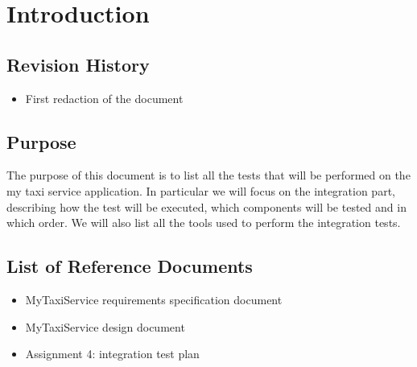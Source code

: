 \section{Introduction}

\subsection{Revision History}
\begin{itemize}
	\item \date{15/01/2016} First redaction of the document
\end{itemize}

\subsection{Purpose}
The purpose of this document is to list all the tests that will be performed on the my taxi service application. 
In particular we will focus on the integration part, describing how the test will be executed, which components will be tested and in which order.
We will also list all the tools used to perform the integration tests.

\subsection{List of Reference Documents}
\begin{itemize}
	\item MyTaxiService requirements specification document
	\item MyTaxiService design document
	\item Assignment 4: integration test plan
\end{itemize}
